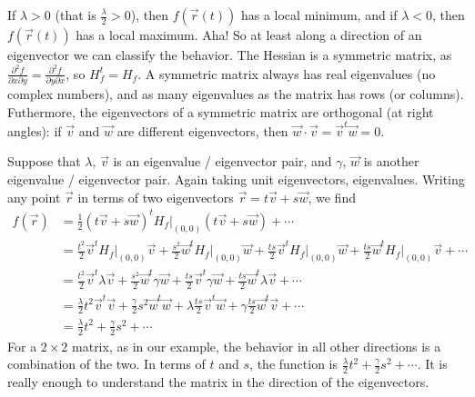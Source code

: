\documentclass[12pt]{article}
\begin{document}
If $\lambda > 0$ (that is $\frac{\lambda}{2} > 0$), then
$f(\vec{r}(t))$ has a local minimum, and if 
$\lambda < 0$, then
$f(\vec{r}(t))$ has a local maximum.  Aha!  So at least along a direction of
an eigenvector we can classify the behavior.
The Hessian is a
symmetric matrix, as
$\frac{\partial^2 f}{\partial x \partial y} = 
\frac{\partial^2 f}{\partial y \partial x}$, so $H_f^t = H_f$.  A symmetric
matrix always has real eigenvalues (no complex numbers),
and as many eigenvalues as the matrix has rows (or columns).
Futhermore, the eigenvectors of a symmetric matrix are orthogonal (at right angles): if $\vec{v}$ and
$\vec{w}$ are different eigenvectors, then
$\vec{w} \cdot \vec{v} = \vec{v}^t \vec{w} = 0$.

Suppose that $\lambda$, $\vec{v}$ is an eigenvalue / eigenvector pair,
and $\gamma$, $\vec{w}$ is another eigenvalue / eigenvector pair.  Again
taking unit eigenvectors, eigenvalues.
Writing any point $\vec{r}$ in terms of two eigenvectors
$\vec{r} = t \vec{v} + s \vec{w}$, we find
\begin{equation*}
\begin{split}
f(\vec{r}) & = 
\frac{1}{2} (t \vec{v} + s \vec{w})^{t} H_f\big|_{(0,0)} (t \vec{v} + s \vec{w})
+
\cdots 
\\
& =
\frac{t^2}{2} \vec{v}^{t} H_f\big|_{(0,0)} \vec{v}
+
\frac{s^2}{2} \vec{w}^{t} H_f\big|_{(0,0)} \vec{w}
+
\frac{ts}{2} \vec{v}^{t} H_f\big|_{(0,0)} \vec{w}
+
\frac{ts}{2} \vec{w}^{t} H_f\big|_{(0,0)} \vec{v}
+
\cdots 
\\
& =
\frac{t^2}{2} \vec{v}^{t} \lambda \vec{v}
+
\frac{s^2}{2} \vec{w}^{t} \gamma \vec{w}
+
\frac{ts}{2} \vec{v}^{t} \gamma \vec{w}
+
\frac{ts}{2} \vec{w}^{t} \lambda \vec{v}
+
\cdots 
\\
& =
\frac{\lambda}{2} t^2 \vec{v}^{t} \vec{v}
+
\frac{\gamma}{2} s^2 \vec{w}^{t} \vec{w}
+
\lambda \frac{ts}{2} \vec{v}^{t} \vec{w}
+
\gamma \frac{ts}{2} \vec{w}^{t} \vec{v}
+
\cdots 
\\
& =
\frac{\lambda}{2} t^2
+
\frac{\gamma}{2} s^2
+
\cdots 
\end{split}
\end{equation*}
For a $2 \times 2$ matrix, as in our example, the behavior
in all other directions is a combination of the two.  In terms
of $t$ and $s$, the function is $\frac{\lambda}{2} t^2 + \frac{\gamma}{2}
s^2 + \cdots$.
It is really
enough to understand the matrix in the direction of the eigenvectors.
\end{document}
